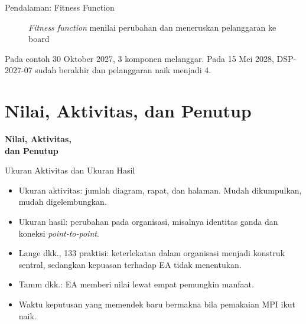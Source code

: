 \documentclass[aspectratio=169, table, 12pt]{beamer}
\begin{document}
\begin{frame}{{\Large Pendalaman: Fitness Function}}
  \centering
  \begin{figure}
    \resizebox{0.76\textwidth}{!}{}
    \caption{\textit{Fitness function} menilai perubahan dan meneruskan pelanggaran ke board}
  \end{figure}
  \vspace{-6pt}
  \small Pada contoh 30 Oktober 2027, 3 komponen melanggar. Pada 15 Mei 2028, DSP-2027-07 sudah berakhir
  dan pelanggaran naik menjadi 4.
\end{frame}

\section{Nilai, Aktivitas, dan Penutup}

\begin{frame}{\hfill}
  \centering
  \Huge{\textbf{Nilai, Aktivitas,\\dan Penutup}}
\end{frame}

\begin{frame}{{\Large Ukuran Aktivitas dan Ukuran Hasil}}
  \small
  \vspace{4pt}
  \begin{itemize}
    \item Ukuran aktivitas: jumlah diagram, rapat, dan halaman. Mudah dikumpulkan, mudah digelembungkan.
    \item Ukuran hasil: perubahan pada organisasi, misalnya identitas ganda dan koneksi
          \textit{point-to-point}.
    \item Lange dkk., 133 praktisi: keterlekatan dalam organisasi menjadi konstruk sentral, sedangkan
          kepuasan terhadap EA tidak menentukan.
    \item Tamm dkk.: EA memberi nilai lewat empat pemungkin manfaat.
    \item Waktu keputusan yang memendek baru bermakna bila pemakaian MPI ikut naik.
  \end{itemize}
\end{frame}
\end{document}
